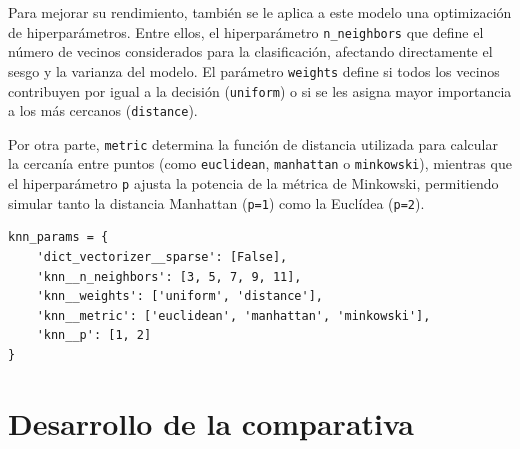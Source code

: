 \documentclass[11pt,a4paper,spanish]{book}
\numberwithin{equation}{chapter}
\numberwithin{figure}{chapter}
\begin{document}
Para mejorar su rendimiento, también se le aplica a este modelo una optimización de 
hiperparámetros. Entre ellos, el hiperparámetro \lstinline|n_neighbors| que define el 
número de vecinos considerados para la clasificación, afectando directamente el sesgo y 
la varianza del modelo. El parámetro \lstinline|weights| define si todos los vecinos 
contribuyen por igual a la decisión (\lstinline|uniform|) o si se les asigna mayor 
importancia a los más cercanos (\lstinline|distance|). 


Por otra parte, \lstinline|metric| 
determina la función de distancia utilizada para calcular la cercanía entre puntos 
(como \lstinline|euclidean|, \lstinline|manhattan| o \lstinline|minkowski|), mientras 
que el hiperparámetro \lstinline|p| ajusta la potencia de la métrica de Minkowski, 
permitiendo simular tanto la distancia Manhattan (\lstinline|p=1|) como la 
Euclídea (\lstinline|p=2|). 


\vspace{5mm}
\begin{lstlisting}
knn_params = {
    'dict_vectorizer__sparse': [False],
    'knn__n_neighbors': [3, 5, 7, 9, 11],     
    'knn__weights': ['uniform', 'distance'],  
    'knn__metric': ['euclidean', 'manhattan', 'minkowski'],  
    'knn__p': [1, 2]  
}
\end{lstlisting}


\section{Desarrollo de la comparativa}
\end{document}
